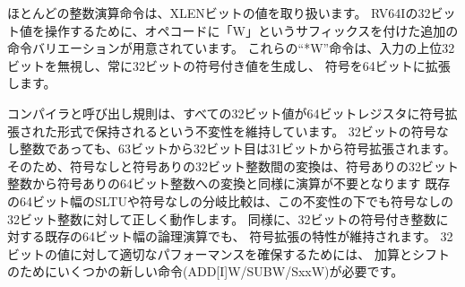 \begin{comment}
Most integer computational instructions operate on XLEN-bit values.
Additional instruction variants are provided to manipulate 32-bit
values in RV64I, indicated by a `W' suffix to the opcode.  These
``*W'' instructions ignore the upper 32 bits of their inputs and
always produce 32-bit signed values, sign-extending them to 64 bits,
i.e. bits XLEN-1 through 31 are equal.
\end{comment}

ほとんどの整数演算命令は、XLENビットの値を取り扱います。
RV64Iの32ビット値を操作するために、オペコードに「W」というサフィックスを付けた追加の命令バリエーションが用意されています。
これらの``*W''命令は、入力の上位32ビットを無視し、常に32ビットの符号付き値を生成し、
符号を64ビットに拡張します。

\begin{commentary}
\begin{comment}
The compiler and calling convention maintain an invariant that all 32-bit
values are held in a sign-extended format in 64-bit registers.  Even 32-bit
unsigned integers extend bit 31 into bits 63 through 32.  Consequently,
conversion between unsigned and signed 32-bit integers is a no-op,
as is conversion from a signed 32-bit integer to a signed 64-bit
integer.  Existing 64-bit wide SLTU and unsigned branch compares still operate
correctly on unsigned 32-bit integers under this invariant.  Similarly,
existing 64-bit wide logical operations on 32-bit sign-extended integers
preserve the sign-extension property.  A few new instructions
(ADD[I]W/SUBW/SxxW) are required for addition and shifts to ensure reasonable
performance for 32-bit values.
\end{comment}
コンパイラと呼び出し規則は、すべての32ビット値が64ビットレジスタに符号拡張された形式で保持されるという不変性を維持しています。
32ビットの符号なし整数であっても、63ビットから32ビット目は31ビットから符号拡張されます。
そのため、符号なしと符号ありの32ビット整数間の変換は、符号ありの32ビット整数から符号ありの64ビット整数への変換と同様に演算が不要となります
既存の64ビット幅のSLTUや符号なしの分岐比較は、この不変性の下でも符号なしの32ビット整数に対して正しく動作します。
同様に、32ビットの符号付き整数に対する既存の64ビット幅の論理演算でも、
符号拡張の特性が維持されます。
32ビットの値に対して適切なパフォーマンスを確保するためには、
加算とシフトのためにいくつかの新しい命令(ADD[I]W/SUBW/SxxW)が必要です。
\end{commentary}

